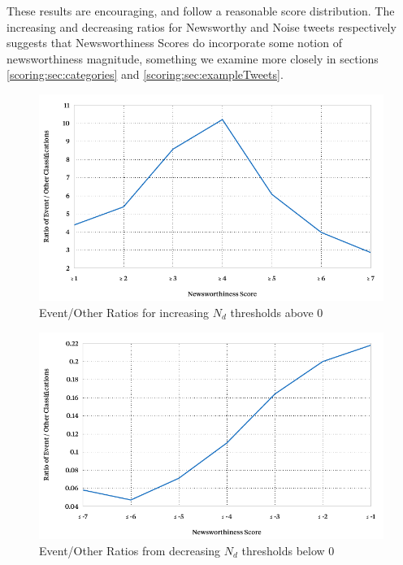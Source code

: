 These results are encouraging, and follow a reasonable score distribution. The increasing and decreasing ratios for Newsworthy and Noise tweets respectively suggests that Newsworthiness Scores do incorporate some notion of newsworthiness magnitude, something we examine more closely in sections \ref{scoring:sec:categories} and \ref{scoring:sec:exampleTweets}.

\begin{figure}[h!]
	\centering
	\includegraphics[width=\textwidth]{Chapters/Newsworthiness/data/table59.pdf}
	\caption{Event/Other Ratios for increasing $N_d$ thresholds above 0}
	\label{scoring:graphic:newsworthy}
\end{figure}

\begin{figure}[h!]
	\centering
	\includegraphics[width=\textwidth]{Chapters/Newsworthiness/data/table59-noise.pdf}
	\caption{Event/Other Ratios from decreasing $N_d$ thresholds below 0}
	\label{scoring:graphic:newsworth-noise}
\end{figure}


